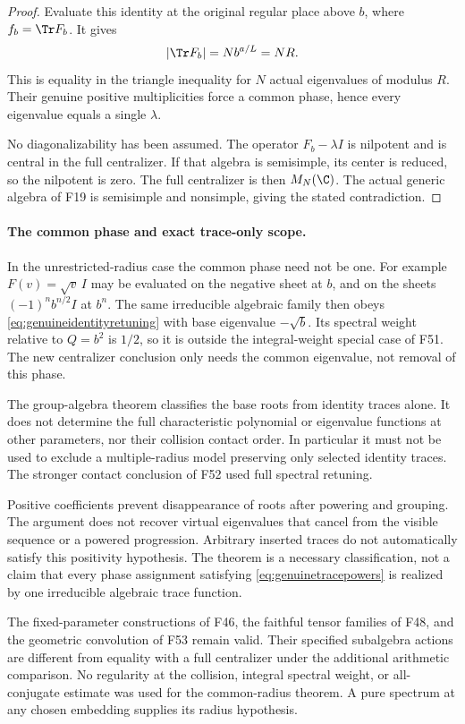 \documentclass[11pt,a4paper]{article}
\newcommand{\fid}[1]{\textsf{#1}}\newcommand{\gate}[1]{\textsf{#1}}
\theoremstyle{named}\newtheorem{finding}{Finding}[section]
\theoremstyle{definition}\newtheorem{definition}[finding]{Definition}
\theoremstyle{remark}\newtheorem{remark}[finding]{Remark}
\begin{document}
\begin{proof}
Evaluate this identity at the original regular place
above $b$, where $f_b=\Tr F_b$.
It gives
\[
 |\Tr F_b|=N b^{a/L}=NR.
\]
This is equality in the triangle inequality for $N$
actual eigenvalues of modulus $R$.
Their genuine positive multiplicities force a common
phase, hence every eigenvalue equals a single $\lambda$.

No diagonalizability has been assumed.
The operator $F_b-\lambda I$ is nilpotent and is
central in the full centralizer.
If that algebra is semisimple, its center is reduced,
so the nilpotent is zero.
The full centralizer is then $M_N(\C)$.
The actual generic algebra of \fid{F19} is semisimple
and nonsimple, giving the stated contradiction.
\end{proof}

\paragraph{The common phase and exact trace-only scope.}
In the unrestricted-radius case the common phase need
not be one.
For example $F(v)=\sqrt v\,I$ may be evaluated on the
negative sheet at $b$, and on the sheets
$(-1)^n b^{n/2}I$ at $b^n$.
The same irreducible algebraic family then obeys
\eqref{eq:genuineidentityretuning} with base eigenvalue
$-\sqrt b$.
Its spectral weight relative to $Q=b^2$ is $1/2$,
so it is outside the integral-weight special case
of \fid{F51}.
The new centralizer conclusion only needs the common
eigenvalue, not removal of this phase.

The group-algebra theorem classifies the base roots
from identity traces alone.
It does not determine the full characteristic
polynomial or eigenvalue functions at other parameters,
nor their collision contact order.
In particular it must not be used to exclude a
multiple-radius model preserving only selected
identity traces.
The stronger contact conclusion of \fid{F52} used
full spectral retuning.

Positive coefficients prevent disappearance of roots
after powering and grouping.
The argument does not recover virtual eigenvalues
that cancel from the visible sequence or a powered
progression.
Arbitrary inserted traces do not automatically
satisfy this positivity hypothesis.
The theorem is a necessary classification, not a
claim that every phase assignment satisfying
\eqref{eq:genuinetracepowers} is realized by one
irreducible algebraic trace function.

The fixed-parameter constructions of \fid{F46},
the faithful tensor families of \fid{F48}, and the
geometric convolution of \fid{F53} remain valid.
Their specified subalgebra actions are different
from equality with a full centralizer under the
additional arithmetic comparison.
No regularity at the collision, integral spectral
weight, or all-conjugate estimate was used for the
common-radius theorem. A pure spectrum at any chosen
embedding supplies its radius hypothesis.
\end{document}
